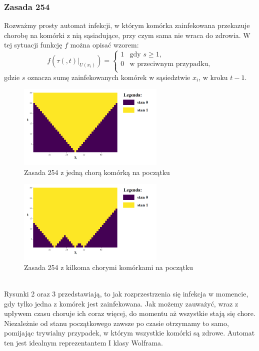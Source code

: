 \documentclass[a4paper,12pt]{article}
\begin{document}
\subsubsection{Zasada 254} Rozważmy prosty automat infekcji, w którym komórka zainfekowana przekazuje chorobę na komórki z nią sąsiadujące, przy czym sama nie wraca do zdrowia. W tej sytuacji funkcję $f$ można opisać wzorem:
$$
f(\tau(,t)|_{U(x_i)})= \left\{ \begin{array}{ll}
1 & \textrm{gdy $s\geq1,$}\\
0 & \textrm{w przeciwnym przypadku,}\\
\end{array} \right.
$$
gdzie $s$ oznacza sumę zainfekowanych komórek w sąsiedztwie $x_i$, w kroku $t-1$.\\
\begin{figure}[h]
    \centering
    \includegraphics[width=7cm]{rule254.png}
    \caption{Zasada 254 z jedną chorą komórką na początku}
    \label{fig:my_label}
\end{figure}
\begin{figure}[h]
    \centering
    \includegraphics[width=7cm]{rule254l.png}
    \caption{Zasada 254 z kilkoma chorymi komórkami na początku}
    \label{fig:my_label}
\end{figure}
\\
Rysunki 2 oraz 3 przedstawiają, to jak rozprzestrzenia się infekcja w momencie, gdy tylko jedna z komórek jest zainfekowana. Jak możemy zauważyć, wraz z upływem czasu choruje ich coraz więcej, do momentu aż wszystkie stają się chore. Niezależnie od stanu początkowego zawsze po czasie otrzymamy to samo, pomijając trywialny przypadek, w którym wszystkie komórki są zdrowe. Automat ten jest idealnym reprezentantem I klasy Wolframa.\\
\end{document}
